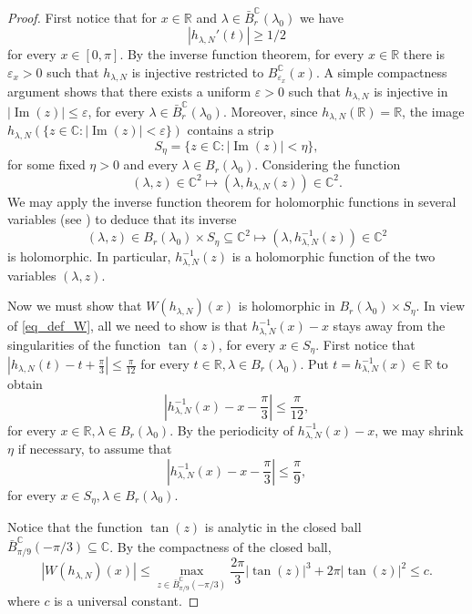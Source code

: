 \documentclass{amsart}
\def \R{\mathbb R}
\def \C{\mathbb C}
\def \im{\operatorname{Im}}
\begin{document}
\begin{proof}
	First notice that for $x \in \R$ and $\lambda \in \bar B^\C_r(\lambda_0)$ we have
	\[|h_{\lambda,N}'(t)| \geq 1/2\]
	for every $x \in [0, \pi]$.
	By the inverse function theorem, for every $x \in \R$ there is $\varepsilon_x>0$ such that
	$h_{\lambda,N}$ is injective restricted to $B^\C_{\varepsilon_x}(x)$.
	A simple compactness argument shows that there exists a uniform $\varepsilon>0$ such that
	$h_{\lambda,N}$ is injective in $|\im(z)| \leq \varepsilon$, for every $\lambda \in \bar B^\C_r(\lambda_0)$.
	Moreover, since $h_{\lambda,N}(\R) = \R$, the image $h_{\lambda,N}(\{z \in \C : |\im(z)| < \varepsilon\})$ contains a strip
	\[
		S_\eta = \{z \in \C : |\im(z)| < \eta\},
	\]
	for some fixed $\eta>0$ and every $\lambda \in B_r(\lambda_0)$.
	Considering the function
	\[
		(\lambda, z) \in \C^2 \mapsto (\lambda, h_{\lambda,N}(z)) \in \C^2.
	\]
	We may apply the inverse function theorem for holomorphic functions in several variables (see \cite[Theorem 5.5]{laurent2010holomorphic}) to deduce that its inverse
	\[
		(\lambda, z) \in B_r(\lambda_0) \times S_\eta \subseteq \C^2 \mapsto (\lambda, h_{\lambda,N}^{-1}(z)) \in \C^2
	\]
	is holomorphic. In particular, $h_{\lambda,N}^{-1}(z)$ is a holomorphic function of the two variables $(\lambda, z)$.

	Now we must show that $W(h_{\lambda, N})(x)$ is holomorphic in $B_r(\lambda_0) \times S_\eta$.
	In view of \eqref{eq_def_W}, all we need to show is that $h_{\lambda,N}^{-1}(x) -x$ stays away from the singularities of the function $\tan(z)$, for every $x \in S_\eta$.
	First notice that $|h_{\lambda,N}(t) - t + \frac \pi 3| \leq \frac \pi {12}$ for every $t \in \R, \lambda \in B_r(\lambda_0)$.
	Put $t = h_{\lambda,N}^{-1}(x) \in \R$ to obtain
	\[
		|h_{\lambda,N}^{-1}(x) - x - \frac \pi 3| \leq \frac \pi {12},
	\]
	for every $x \in \R, \lambda \in B_r(\lambda_0)$.
	By the periodicity of $h_{\lambda,N}^{-1}(x) - x$, we may shrink $\eta$ if necessary, to assume that
	\[
		|h_{\lambda,N}^{-1}(x) - x - \frac \pi 3| \leq \frac \pi {9},
	\]
	for every $x \in S_\eta, \lambda \in B_r(\lambda_0)$.

	Notice that the function $\tan(z)$ is analytic in the closed ball $\bar B^\C_{\pi/9}(-\pi/3) \subseteq \C$.
	By the compactness of the closed ball, 
	\[|W(h_{\lambda,N})(x)| \leq \max_{z \in \bar B^\C_{\pi/9}(-\pi/3)} \frac{2\pi}3 |\tan(z)|^3+2\pi |\tan(z)|^2 \leq c.\]
	where $c$ is a universal constant.
\end{proof}
\end{document}
